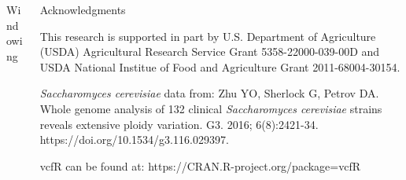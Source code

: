 \begin{columns}[t]
\begin{column}{0.65\textwidth}
\begin{block}{\large Windowing}
    \end{block}
  \end{column}

  \begin{column}{0.32\textwidth}
    \begin{block}{\large Acknowledgments}
\tiny
\vspace{5mm}

This research is supported in part by U.S. Department of Agriculture (USDA) Agricultural Research Service Grant 5358-22000-039-00D and USDA National Institue of Food and Agriculture Grant 2011-68004-30154.
\newline
\vspace{10mm}

\textit{Saccharomyces cerevisiae} data from:
Zhu YO, Sherlock G, Petrov DA. 
Whole genome analysis of 132 clinical \textit{Saccharomyces cerevisiae} strains reveals extensive ploidy variation.
G3. 2016; 6(8):2421-34. https://doi.org/10.1534/g3.116.029397.
\newline
\vspace{10mm}

vcfR can be found at:
https://CRAN.R-project.org/package=vcfR

\vspace{15mm}

    \end{block}
  \end{column}
\end{columns}


